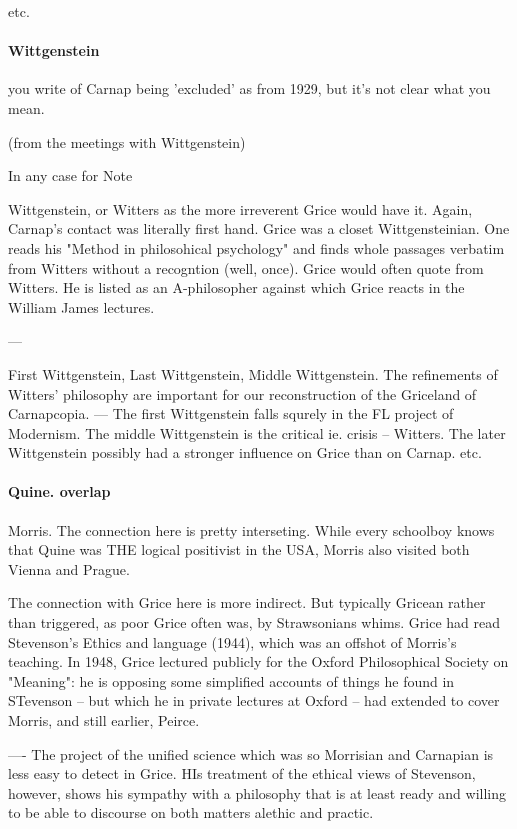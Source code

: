 \documentclass[10pt,titlepage]{book}
\begin{document}
etc. 

\paragraph{Wittgenstein}

you write of Carnap being 'excluded' as from 1929, but it's not clear what  
you mean.

(from the meetings with Wittgenstein)
 
In any case for Note
 
Wittgenstein, or Witters as the more irreverent Grice would have it.
Again, Carnap's contact was literally first hand.
Grice was a closet Wittgensteinian.
One reads his "Method in philosohical psychology" and finds whole 
passages verbatim from Witters without a recogntion (well, once).
Grice would often quote from Witters.
He is listed as an A-philosopher against which Grice reacts in the William James lectures.
 
---
 
First Wittgenstein, Last Wittgenstein, Middle Wittgenstein. The refinements 
 of Witters' philosophy are important for our reconstruction of the 
Griceland of  Carnapcopia. --- The first Wittgenstein falls squrely in the FL 
project of  Modernism. The middle Wittgenstein is the critical ie. crisis -- 
Witters. The  later Wittgenstein possibly had  a stronger influence on Grice 
than on  Carnap.
etc.

\paragraph{Quine. overlap}
 
Morris. The connection here is pretty interseting. While every schoolboy  
knows that Quine was THE logical positivist in the USA, Morris also visited 
both  Vienna and Prague.
 
The connection with Grice here is more indirect. But typically Gricean  
rather than triggered, as poor Grice often was, by Strawsonians whims. Grice 
had  read Stevenson's Ethics and language (1944), which was an offshot of 
Morris's  teaching. In 1948, Grice lectured publicly for the Oxford 
Philosophical Society  on "Meaning": he is opposing some simplified accounts of things 
he found in  STevenson -- but which he in private lectures at Oxford --  had 
extended to  cover Morris, and still earlier, Peirce.
 
---- The project of the unified science which was so Morrisian and  
Carnapian is less easy to detect in Grice. HIs treatment of the ethical views of  
Stevenson, however, shows his sympathy with a philosophy that is at least 
ready  and willing to be able to discourse on both matters alethic and practic.
 
\end{document}
